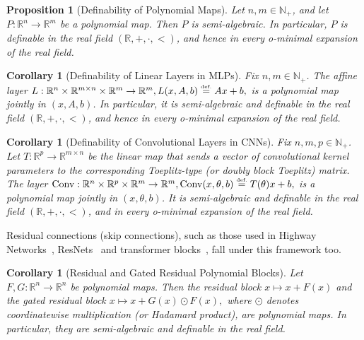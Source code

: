 \documentclass{article}
\newcommand{\eqdef}{\ensuremath{\stackrel{\mbox{\upshape\tiny def.}}{=}}}
\theoremstyle{plain}
\newtheorem{proposition}[theorem]{Proposition}
\newtheorem{corollary}[theorem]{Corollary}
\theoremstyle{definition}
\theoremstyle{remark}
\theoremstyle{plain}
\numberwithin{thm}{section}
\theoremstyle{definition}
\numberwithin{equation}{section}
\begin{document}
\begin{proposition}[Definability of Polynomial Maps]
\label{prop:polynomial_maps_definable}
Let $n,m\in\mathbb{N}_+$, and let
$
    P:\mathbb{R}^n\to\mathbb{R}^m
$
be a polynomial map.  Then $P$ is semi-algebraic.  In particular, $P$ is definable in the real field $(\mathbb{R},+,\cdot,<)$, and hence in every o-minimal expansion of the real field.
\end{proposition}

\begin{corollary}[Definability of Linear Layers in MLPs]
\label{cor:linear_affine_layers_definable}
Fix $n,m\in\mathbb{N}_+$.  The affine layer $L:\mathbb{R}^n\times \mathbb{R}^{m\times n}\times \mathbb{R}^m
    \to \mathbb{R}^m, L(x,A,b)\eqdef Ax+b,$ is a polynomial map jointly in $(x,A,b)$.  In particular, it is semi-algebraic and definable in the real field $(\mathbb{R},+,\cdot,<)$, and hence in every o-minimal expansion of the real field.
\end{corollary}

\begin{corollary}[Definability of Convolutional Layers in CNNs]
\label{cor:convolutional_layers_definable}
Fix $n,m,p\in\mathbb{N}_+$.  Let
$
    T:\mathbb{R}^p\to\mathbb{R}^{m\times n}
$
be the linear map that sends a vector of convolutional kernel parameters to the corresponding Toeplitz-type (or doubly block Toeplitz) matrix.  The layer $\operatorname{Conv}: \mathbb{R}^n\times\mathbb{R}^p\times\mathbb{R}^m
    \to
    \mathbb{R}^m,
    \operatorname{Conv}(x,\theta,b)\eqdef T(\theta)x+b,$
is a polynomial map jointly in $(x,\theta,b)$.  It is semi-algebraic and definable in the real field $(\mathbb{R},+,\cdot,<)$, and in every o-minimal expansion of the real field.
\end{corollary}

Residual connections (skip connections), such as those used in Highway
Networks~\cite{srivastava2015highwaynetworks,10.5555/2969442.2969505}, ResNets~\cite{resnet} and transformer blocks~\citep{vaswani2017attention}, fall under this framework too.

\begin{corollary}[Residual and Gated Residual Polynomial Blocks]
\label{cor:residual_gated_polynomial_blocks}
Let $F,G:\mathbb{R}^n\to\mathbb{R}^n$ be polynomial maps. Then the residual
block $x \mapsto x+F(x)$
and the gated residual block $x \mapsto x+G(x)\odot F(x),$ where $\odot$ denotes coordinatewise multiplication (or Hadamard product), are polynomial maps. In
particular, they are semi-algebraic and definable in the real field.
\end{corollary}
\end{document}

